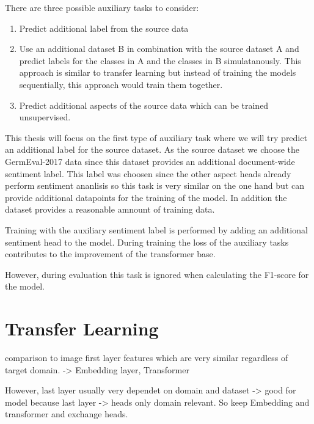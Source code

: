 There are three possible auxiliary tasks to consider:


\begin{enumerate}
	\item Predict additional label from the source data
	\item Use an additional dataset B in combination with the source dataset A and predict labels for the classes in A and the classes in B simulatanously. This approach is similar to transfer learning but instead of training the models sequentially, this approach would train them together.
	\item Predict additional aspects of the source data which can be trained unsupervised.
\end{enumerate}

This thesis will focus on the first type of auxiliary task where we will try predict an additional label for the source dataset. As the source dataset we choose the GermEval-2017 data since this dataset provides an additional document-wide sentiment label. This label was choosen since the other aspect heads already perform sentiment ananlisis so this task is very similar on the one hand but can provide additional datapoints for the training of the model. In addition the dataset provides a reasonable amnount of training data.

Training with the auxiliary sentiment label is performed by adding an additional sentiment head to the model. During training the loss of the auxiliary tasks contributes to the improvement of the transformer base.

However, during evaluation this task is ignored when calculating the F1-score for the model.



\section{Transfer Learning}
\label{sec:04_transferLearning}
comparison to image first layer features which are very similar regardless of target domain. \cite{Yosinski2014} -> Embedding layer, Transformer

However, last layer usually very dependet on domain and dataset -> good for model because last layer -> heads only domain relevant. So keep Embedding and transformer and exchange heads.

